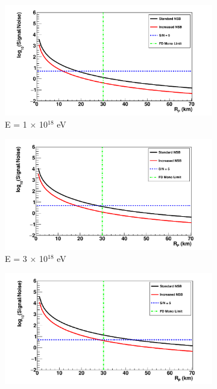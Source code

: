 \begin{figure}
\centering
\begin{subfigure}[b]{0.45\textwidth}
\includegraphics[width=\textwidth]{chapters/graphs/SelectionEff/SignalToNoiseVsDistance_E1e18eV.pdf}
\caption{E = 1 $\times$ 10$^{18}$ eV}
\end{subfigure}
\hspace{3mm}
\begin{subfigure}[b]{0.45\textwidth}
\includegraphics[width=\textwidth]{chapters/graphs/SelectionEff/SignalToNoiseVsDistance_E3e18eV.pdf}
\caption{E = 3 $\times$ 10$^{18}$ eV}
\end{subfigure}
\vspace{3mm}
\begin{subfigure}[b]{0.45\textwidth}
\includegraphics[width=\textwidth]{chapters/graphs/SelectionEff/SignalToNoiseVsDistance_E1e19eV.pdf}

\end{subfigure}
\end{figure}
